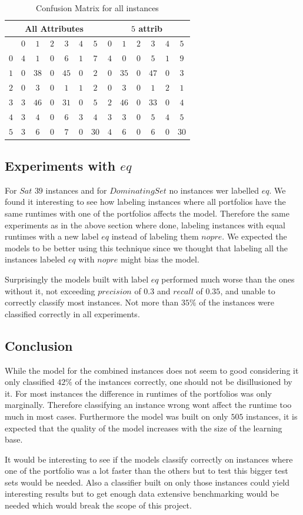 \begin{table}[h]
	\center
	\begin{tabular}{|c|cccccc|cccccc|}
		\hline\multicolumn{7}{|c|}{All Attributes} &\multicolumn{6}{|c|}{$5$ attrib}\\
	\hline &$0$&$1$&$2$&$3$&$4$&$5$&$0$&$1$&$2$&$3$&$4$&$5$\\
\hline$0$&$4$&$1$&$0$&$6$&$1$&$7$&$4$&$0$&$0$&$5$&$1$&$9$\\
$1$&$0$&$38$&$0$&$45$&$0$&$2$&$0$&$35$&$0$&$47$&$0$&$3$\\
$2$&$0$&$3$&$0$&$1$&$1$&$2$&$0$&$3$&$0$&$1$&$2$&$1$\\
$3$&$3$&$46$&$0$&$31$&$0$&$5$&$2$&$46$&$0$&$33$&$0$&$4$\\
$4$&$3$&$4$&$0$&$6$&$3$&$4$&$3$&$3$&$0$&$5$&$4$&$5$\\
$5$&$3$&$6$&$0$&$7$&$0$&$30$&$4$&$6$&$0$&$6$&$0$&$30$\\
\hline
	\end{tabular}
	\caption{Confusion Matrix for all instances}
	\label{tbl:cmbCM}
\end{table}

\subsection{Experiments with $eq$}
For $Sat$ $39$ instances and for $Dominating Set$ no instances wer labelled $eq$. We found it interesting to see how labeling instances where all portfolios have the same runtimes with one of the portfolios affects the model. Therefore the same experiments as in the above section where done, labeling instances with equal runtimes with a new label $eq$ instead of labeling them $nopre$. We expected the models to be better using this technique since we thought that labeling all the instances labeled $eq$ with $nopre$ might bias the model.

Surprisingly the models built with label $eq$ performed much worse than the ones without it, not exceeding $precision$ of $0.3$ and $recall$ of $0.35$, and unable to correctly classify most instances. Not more than $35\%$ of the instances were classified correctly in all experiments.

\subsection{Conclusion}
While the model for the combined instances does not seem to good considering it only classified $42\%$ of the instances correctly, one should not be disillusioned by it. For most instances the difference in runtimes of the portfolios was only marginally. Therefore classifying an instance wrong wont affect the runtime too much in most cases. 
Furthermore the model was built on only $505$ instances, it is expected that the quality of the model increases with the size of the learning base.

It would be interesting to see if the models classify correctly on instances where one of the portfolio was a lot faster than the others but to test this bigger test sets would be needed. Also a classifier built on only those instances could yield interesting results but to get enough data extensive benchmarking would be needed which would break the scope of this project.

